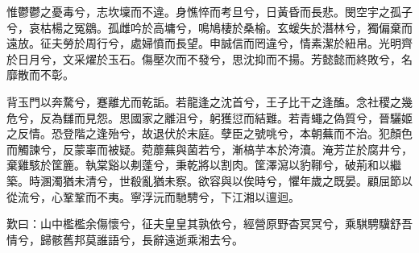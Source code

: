 
\begin{pinyinscope}
惟鬱鬱之憂毒兮，志坎壈而不違。身憔悴而考旦兮，日黃昏而長悲。閔空宇之孤子兮，哀枯楊之冤鶵。孤雌吟於高墉兮，鳴鳩棲於桑榆。玄蝯失於潛林兮，獨偏棄而遠放。征夫勞於周行兮，處婦憤而長望。申誠信而罔違兮，情素潔於紐帛。光明齊於日月兮，文采燿於玉石。傷壓次而不發兮，思沈抑而不揚。芳懿懿而終敗兮，名靡散而不彰。

背玉門以奔騖兮，蹇離尤而乾詬。若龍逢之沈首兮，王子比干之逢醢。念社稷之幾危兮，反為讎而見怨。思國家之離沮兮，躬獲愆而結難。若青蠅之偽質兮，晉驪姬之反情。恐登階之逢殆兮，故退伏於末庭。孽臣之號咷兮，本朝蕪而不治。犯顏色而觸諫兮，反蒙辜而被疑。菀蘼蕪與菌若兮，漸槁芋本於洿瀆。淹芳芷於腐井兮，棄雞駭於筐簏。執棠谿以刜蓬兮，秉乾將以割肉。筐澤瀉以豹鞹兮，破荊和以繼築。時溷濁猶未清兮，世殽亂猶未察。欲容與以俟時兮，懼年歲之既晏。顧屈節以從流兮，心鞏鞏而不夷。寧浮沅而馳騁兮，下江湘以邅迴。

歎曰：山中檻檻余傷懷兮，征夫皇皇其孰依兮，經營原野杳冥冥兮，乘騏騁驥舒吾情兮，歸骸舊邦莫誰語兮，長辭遠逝乘湘去兮。


\end{pinyinscope}